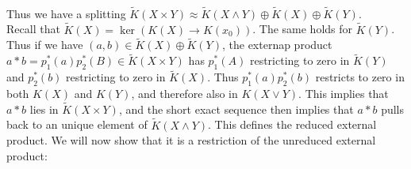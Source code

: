 \documentclass[../Thesis.tex]{subfiles}
\begin{document}
\\Thus we have a splitting $\tilde{K}(X \times Y) \approx \tilde{K}(X \wedge Y) \oplus \tilde{K} (X) \oplus \tilde{K}(Y)$.
\\Recall that $\tilde{K}(X) = \ker( K(X) \rightarrow K(x_0))$. The same holds for $\tilde{K}(Y)$. Thus if we have $(a,b) \in \tilde{K}(X) \oplus \tilde{K}(Y)$, the externap product $a * b = p_1^*(a) p_2^*(B) \in \tilde{K}(X \times Y)$ has $p_1^*(A)$ restricting to zero in $\tilde{K}(Y)$ and $p_2^*(b)$ restricting to zero in $\tilde{K}(X)$. Thus $p_1^*(a)p_2^*(b)$ restricts to zero in both $K(X)$ and $K(Y)$, and therefore also in $K(X \vee Y)$. This implies that $a*b$ lies in $\tilde{K}(X \times Y)$, and the short exact sequence then implies that $a * b$ pulls back to an unique element of $\tilde{K}(X \wedge Y)$. This defines the reduced external product. We will now show that it is a restriction of the unreduced external product:
\end{document}
